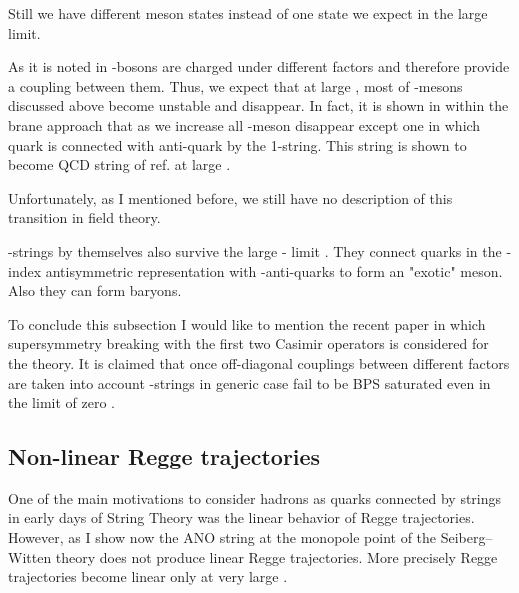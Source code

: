 \documentclass[a4paper,12pt]{article}
\begin{document}
Still we have \myHighlight{$[(N_c+1)/2]$}\coordHE{} different \coordHE{} meson states
instead of one state we expect in the large \myHighlight{$\mu $}\coordHE{} limit.

As it is noted in \cite{DS} \coordHE{}-bosons are charged under
different \coordHE{} factors and therefore provide a coupling between
them. Thus, we expect that at large \myHighlight{$\mu $}\coordHE{}, \myHighlight{$\mu \sim
\Lambda$}\coordHE{} most of \coordHE{}-mesons discussed above
 become unstable and disappear.
In fact, it is shown in \cite{HSZ} within the brane approach
that as we increase \myHighlight{$\mu $}\coordHE{} all \coordHE{}-meson disappear
except one in which quark is connected with anti-quark by the
1-string. This string is shown \cite{HSZ} to become QCD string
of ref.\cite{W} at large \myHighlight{$\mu $}\coordHE{}.

Unfortunately, as I mentioned before, we still have no
description of this transition in  field theory.

\coordHE{}-strings by themselves also survive the large \myHighlight{$\mu $}\coordHE{}-
limit \cite{HSZ}. They connect \coordHE{} quarks in the \coordHE{}-index
antisymmetric representation with \coordHE{}-anti-quarks to form an
"exotic" meson. Also they can form  baryons.

To conclude this subsection I would like to mention the recent
paper \cite{Sp2} in which \coordHE{} supersymmetry breaking
with the first two Casimir operators is considered
for the \coordHE{} theory. It is claimed that
once off-diagonal couplings between different \coordHE{} factors
are taken into account \coordHE{}-strings in generic case 
fail to be BPS saturated
even in the limit of zero \coordHE{}.

\subsection{Non-linear Regge trajectories}

One of the main motivations to consider hadrons as quarks
connected by strings in early days of  String Theory was
the linear behavior of Regge trajectories. However, as I show
now the ANO string at the monopole point of the  Seiberg--Witten
theory does not produce linear Regge trajectories. More
precisely Regge trajectories become linear only at very large
\coordHE{}.
\end{document}
